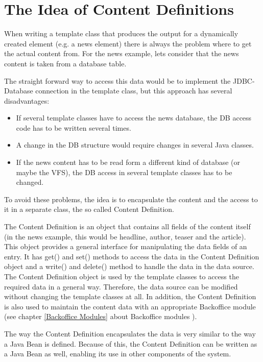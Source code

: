 \chapter{The Idea of Content Definitions}
\label{ideacontentdefinition}
When writing a template class that produces the output  for a
dynamically created element (e.g. a news element) there is always the
problem where to get the actual content from. For the news example, lets
consider that the news content is taken from a database table.

The straight forward way to access this data would be to implement the
JDBC-Database connection in the template class, but this approach has
several disadvantages:
\begin{itemize}
\item If several template classes have to access the news database,
the DB access code has to be written several times.
\item A change in the DB structure would require changes in several
Java classes.
\item If the news content has to be read form a different kind of
database (or maybe the VFS), the DB access in several template classes
has to be changed.
\end{itemize}

To avoid these problems, the idea is to encapsulate the content and
the access to it in a separate class, the so called Content Definition.

The Content Definition is an object that contains all fields of the
content itself (in the news example, this would be headline, author,
teaser and the article). This object provides a general interface for manipulating
the data fields of an entry. It has {\meth get()} and {\meth set()} methods to access the data 
in the Content Definition object and a {\meth write()} 
and {\meth delete()} method to handle the data in the data source.
The Content Definition object is used by the template classes to access 
the required data in a general way. 
Therefore, the data source can be modified without changing the template classes at all. 
In addition, the Content Definition is also used to maintain the content
data with an appropriate Backoffice module (see chapter \ref{Backoffice Modules}
about Backoffice modules ).

The way the Content Definition encapsulates the data is very similar to
the way a Java Bean is defined. Because of this, the Content Definition
can be written as a Java Bean as well, enabling its use in other
components of the system.

